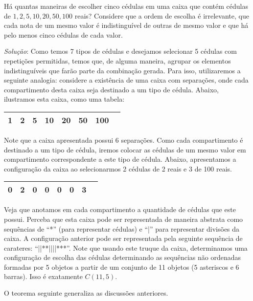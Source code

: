 \begin{Example}
Há quantas maneiras de escolher cinco cédulas em uma caixa que contém
cédulas de $1,2,5,10,20,50,100$ reais? Considere que a ordem de
escolha é irrelevante, que cada nota de um mesmo valor é
indistinguível de outras de mesmo valor e que há pelo menos cinco
cédulas de cada valor.

\textit{Solução}:
Como temos 7 tipos de cédulas e desejamos selecionar 5 cédulas com
repetições permitidas, temos que, de alguma maneira, agrupar os
elementos indistinguíveis que farão parte da combinação gerada. Para
isso, utilizaremos a seguinte analogia: considere a existência de uma
caixa com separações, onde cada compartimento desta caixa seja
destinado a um tipo de cédula. Abaixo, ilustramos esta caixa, como uma
tabela:

\begin{table}[h]
\begin{tabular}{|c|c|c|c|c|c|c|c|}
\hline
1 & 2 & 5 &10 & 20 & 50 & 100 \\ \hline
\end{tabular}
\centering
\end{table}

Note que a caixa apresentada possui 6 separações. Como cada
compartimento é destinado a um tipo de cédula, iremos colocar as
cédulas de um mesmo valor em compartimento correspondente a este tipo
de cédula. Abaixo, apresentamos a configuração da caixa ao
selecionarmos 2 cédulas de 2 reais e 3 de 100 reais.

\begin{table}[h]
\begin{tabular}{|c|c|c|c|c|c|c|c|}
\hline
0 & 2 & 0 & 0 & 0 & 0 & 3 \\ \hline
\end{tabular}
\centering
\end{table}

Veja que anotamos em cada compartimento a quantidade de cédulas que
este possui. Perceba que esta caixa pode ser representada de maneira
abstrata como sequências de ``*'' (para representar cédulas) e ``|''
para representar divisões da caixa. A configuração anterior pode ser
representada pela seguinte sequência de carateres:
``||**||||***''. Note que usando este truque da caixa, determinamos
uma configuração de escolha das cédulas determinando as sequências não
ordenadas formadas por 5 objetos a partir de um conjunto de 11 objetos
(5 asteriscos e 6 barras). Isso é exatamente $C(11,5)$.
\end{Example}
O teorema seguinte generaliza as discussões anteriores.
